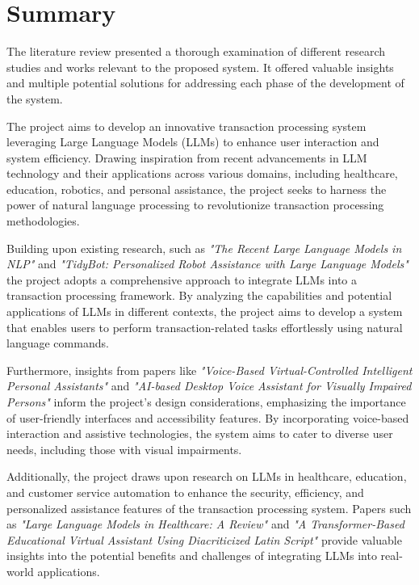 \section{Summary}

\noindent 
The literature review presented a thorough examination of different research studies and works relevant to the proposed system. It offered valuable insights and multiple potential solutions for addressing each phase of the development of the system.

\vspace{3mm}

\noindent
The project aims to develop an innovative transaction processing system leveraging Large Language Models (LLMs) to enhance user interaction and system efficiency. Drawing inspiration from recent advancements in LLM technology and their applications across various domains, including healthcare, education, robotics, and personal assistance, the project seeks to harness the power of natural language processing to revolutionize transaction processing methodologies.

\vspace{3mm}

\noindent
Building upon existing research, such as {\it"The Recent Large Language Models in NLP"} and {\it"TidyBot: Personalized Robot Assistance with Large Language Models"} the project adopts a comprehensive approach to integrate LLMs into a transaction processing framework. By analyzing the capabilities and potential applications of LLMs in different contexts, the project aims to develop a system that enables users to perform transaction-related tasks effortlessly using natural language commands.

\noindent
Furthermore, insights from papers like {\it"Voice-Based Virtual-Controlled Intelligent Personal Assistants"} and {\it"AI-based Desktop Voice Assistant for Visually Impaired Persons"} inform the project's design considerations, emphasizing the importance of user-friendly interfaces and accessibility features. By incorporating voice-based interaction and assistive technologies, the system aims to cater to diverse user needs, including those with visual impairments.

\vspace{3mm}

\noindent
Additionally, the project draws upon research on LLMs in healthcare, education, and customer service automation to enhance the security, efficiency, and personalized assistance features of the transaction processing system. Papers such as {\it"Large Language Models in Healthcare: A Review"} and {\it"A Transformer-Based Educational Virtual Assistant Using Diacriticized Latin Script"} provide valuable insights into the potential benefits and challenges of integrating LLMs into real-world applications.

